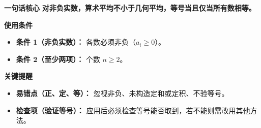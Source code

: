 \begin{summarybox}
	\textbf{\textcolor{CSummary}{一句话核心}}
	\textbf{对非负实数，算术平均不小于几何平均，等号当且仅当所有数相等。}

	\medskip
	\textbf{\textcolor{CSummary}{使用条件}}
	\begin{itemize}[leftmargin=*, itemsep=0.5em, topsep=0.4em]
		\item \textbf{条件 1（非负实数）：} 各数必须非负（$a_i \ge 0$）。
		\item \textbf{条件 2（至少两项）：} 个数 $n \ge 2$。
	\end{itemize}

	\medskip
	\textbf{\textcolor{CSummary}{关键提醒}}
	\begin{itemize}[leftmargin=*, itemsep=0.5em, topsep=0.4em]
		\item \textbf{易错点（正、定、等）：} 忽视非负、未构造定和或定积、不验等号。
		\item \textbf{检查项（验证等号）：} 应用后必须检查等号能否取到，若不能则需改用其他方法。
	\end{itemize}

\end{summarybox}
